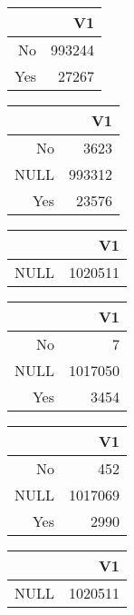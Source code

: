 \bigskip\bigskip
\centering
\begin{tabular}{rr}
  \hline
 & V1 \\ 
  \hline
No & 993244 \\ 
  Yes & 27267 \\ 
   \hline
\end{tabular}

\bigskip\bigskip
\centering
\begin{tabular}{rr}
  \hline
 & V1 \\ 
  \hline
No & 3623 \\ 
  NULL & 993312 \\ 
  Yes & 23576 \\ 
   \hline
\end{tabular}

\bigskip\bigskip
\centering
\begin{tabular}{rr}
  \hline
 & V1 \\ 
  \hline
NULL & 1020511 \\ 
   \hline
\end{tabular}

\bigskip\bigskip
\centering
\begin{tabular}{rr}
  \hline
 & V1 \\ 
  \hline
No &   7 \\ 
  NULL & 1017050 \\ 
  Yes & 3454 \\ 
   \hline
\end{tabular}

\bigskip\bigskip
\centering
\begin{tabular}{rr}
  \hline
 & V1 \\ 
  \hline
No & 452 \\ 
  NULL & 1017069 \\ 
  Yes & 2990 \\ 
   \hline
\end{tabular}

\bigskip\bigskip
\centering
\begin{tabular}{rr}
  \hline
 & V1 \\ 
  \hline
NULL & 1020511 \\ 
   \hline
\end{tabular}

